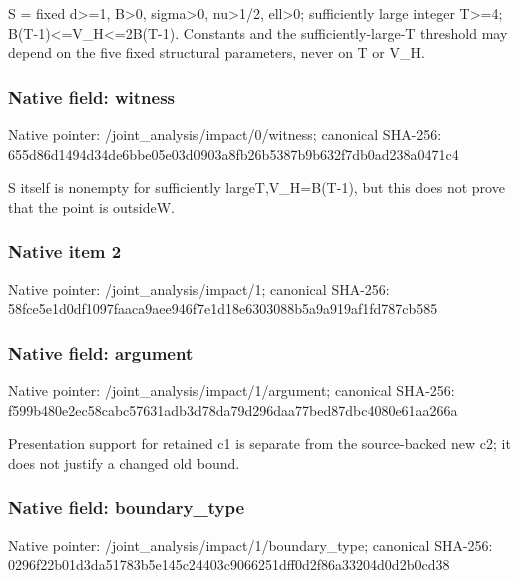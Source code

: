 \documentclass[10pt,a4paper]{article}
\begin{document}
\begingroup\raggedright\sloppy S =\allowbreak{} fixed d>=\allowbreak{}1,\allowbreak{} B>0,\allowbreak{} sigma>0,\allowbreak{} nu>1/\allowbreak{}2,\allowbreak{} ell>0;\allowbreak{} sufficiently large integer T>=\allowbreak{}4;\allowbreak{} B(T-1)<=\allowbreak{}V\_\allowbreak{}H<=\allowbreak{}2B(T-1). Constants and the sufficiently-large-T threshold may depend on the five fixed structural parameters,\allowbreak{} never on T or V\_\allowbreak{}H.\par\endgroup

\subsubsection{Native field: witness}
Native pointer: /joint\_\allowbreak{}analysis/impact/0/witness; canonical SHA-256: 655d86d1494d34de6bbe05e03d0903a8fb26b5387b9b632f7db0ad238a0471c4

\begingroup\raggedright\sloppy S itself is nonempty for sufficiently largeT,\allowbreak{}V\_\allowbreak{}H=\allowbreak{}B(T-1),\allowbreak{} but this does not prove that the point is outsideW.\par\endgroup

\subsubsection{Native item 2}
Native pointer: /joint\_\allowbreak{}analysis/impact/1; canonical SHA-256: 58fce5e1d0df1097faaca9aee946f7e1d18e6303088b5a9a919af1fd787cb585

\subsubsection{Native field: argument}
Native pointer: /joint\_\allowbreak{}analysis/impact/1/argument; canonical SHA-256: f599b480e2ec58cabc57631adb3d78da79d296daa77bed87dbc4080e61aa266a

\begingroup\raggedright\sloppy Presentation support for retained c1 is separate from the source-backed new c2;\allowbreak{} it does not justify a changed old bound.\par\endgroup

\subsubsection{Native field: boundary\_\allowbreak{}type}
Native pointer: /joint\_\allowbreak{}analysis/impact/1/boundary\_\allowbreak{}type; canonical SHA-256: 0296f22b01d3da51783b5e145c24403c9066251dff0d2f86a33204d0d2b0cd38
\end{document}
